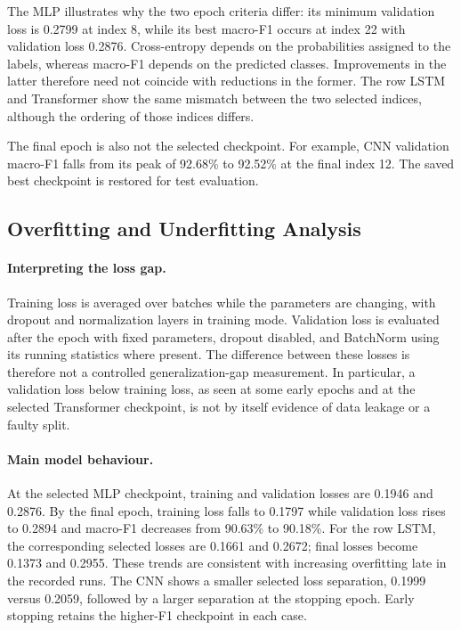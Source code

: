 The MLP illustrates why the two epoch criteria differ: its minimum validation loss is 0.2799 at index 8, while its best macro-F1 occurs at index 22 with validation loss 0.2876. Cross-entropy depends on the probabilities assigned to the labels, whereas macro-F1 depends on the predicted classes. Improvements in the latter therefore need not coincide with reductions in the former. The row LSTM and Transformer show the same mismatch between the two selected indices, although the ordering of those indices differs.

The final epoch is also not the selected checkpoint. For example, CNN validation macro-F1 falls from its peak of 92.68\% to 92.52\% at the final index 12. The saved best checkpoint is restored for test evaluation.

\subsection{Overfitting and Underfitting Analysis}

\paragraph{Interpreting the loss gap.}
Training loss is averaged over batches while the parameters are changing, with dropout and normalization layers in training mode. Validation loss is evaluated after the epoch with fixed parameters, dropout disabled, and BatchNorm using its running statistics where present. The difference between these losses is therefore not a controlled generalization-gap measurement. In particular, a validation loss below training loss, as seen at some early epochs and at the selected Transformer checkpoint, is not by itself evidence of data leakage or a faulty split.

\paragraph{Main model behaviour.}
At the selected MLP checkpoint, training and validation losses are 0.1946 and 0.2876. By the final epoch, training loss falls to 0.1797 while validation loss rises to 0.2894 and macro-F1 decreases from 90.63\% to 90.18\%. For the row LSTM, the corresponding selected losses are 0.1661 and 0.2672; final losses become 0.1373 and 0.2955. These trends are consistent with increasing overfitting late in the recorded runs. The CNN shows a smaller selected loss separation, 0.1999 versus 0.2059, followed by a larger separation at the stopping epoch. Early stopping retains the higher-F1 checkpoint in each case.

